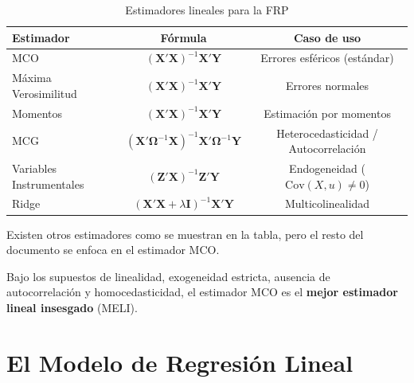 \documentclass[11pt,a4paper]{article}
\begin{document}
\begin{table}[H]
\centering
\caption{Estimadores lineales para la FRP}
\label{tab:estimadores}
\begin{tabular}{lcc}
\hline
\textbf{Estimador} & \textbf{Fórmula} & \textbf{Caso de uso} \\
\hline
MCO & \((\mathbf{X}'\mathbf{X})^{-1}\mathbf{X}'\mathbf{Y}\) & Errores esféricos (estándar) \\
Máxima Verosimilitud & \((\mathbf{X}'\mathbf{X})^{-1}\mathbf{X}'\mathbf{Y}\) & Errores normales \\
Momentos & \((\mathbf{X}'\mathbf{X})^{-1}\mathbf{X}'\mathbf{Y}\) & Estimación por momentos \\
MCG & \((\mathbf{X}'\boldsymbol{\Omega}^{-1}\mathbf{X})^{-1}\mathbf{X}'\boldsymbol{\Omega}^{-1}\mathbf{Y}\) & Heterocedasticidad / Autocorrelación \\
Variables Instrumentales & \((\mathbf{Z}'\mathbf{X})^{-1}\mathbf{Z}'\mathbf{Y}\) & Endogeneidad (\(\text{Cov}(X,u)\neq0\)) \\
Ridge & \((\mathbf{X}'\mathbf{X} + \lambda\mathbf{I})^{-1}\mathbf{X}'\mathbf{Y}\) & Multicolinealidad \\
\hline
\end{tabular}
\end{table}

\begin{observacion}
Existen otros estimadores como se muestran en la tabla, pero el resto del documento se enfoca en el estimador MCO.
\end{observacion}

\begin{propiedad}
Bajo los supuestos de linealidad, exogeneidad estricta, ausencia de autocorrelación y homocedasticidad, el estimador MCO es el \textbf{mejor estimador lineal insesgado} (MELI).
\end{propiedad}
















\section{El Modelo de Regresión Lineal}
\end{document}
